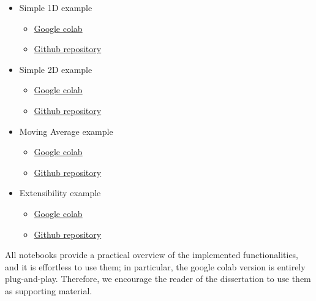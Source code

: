 \begin{itemize}
\item Simple 1D example
  \begin{itemize}
  \item \href{https://colab.research.google.com/drive/13znoPzew3sS89QD-j5usEOefIPNu655Y?usp=sharing}{Google colab}
  \item \href{https://github.com/givasile/edinburgh-thesis/blob/master/notebook_examples/example_1D.ipynb}{Github repository}
  \end{itemize}
 
\item Simple 2D example
  \begin{itemize}
  \item
    \href{https://colab.research.google.com/drive/1T8919FCAi2w9MXm9XKT_iJLnB0y1EN32?usp=sharing}{Google colab}
  \item \href{https://github.com/givasile/edinburgh-thesis/blob/master/notebook_examples/example_2D.ipynb}{Github repository}
  \end{itemize}

\item Moving Average example  
  \begin{itemize}
  \item
    \href{https://colab.research.google.com/drive/145s0-sMSUgi30MeS48SmiJlkd5GYrSQU?usp=sharing}{Google colab}
  \item
    \href{https://github.com/givasile/edinburgh-thesis/blob/master/notebook_examples/example_ma2.ipynb}{Github repository}
  \end{itemize}

\item Extensibility example
  \begin{itemize}
  \item
    \href{https://colab.research.google.com/drive/145s0-sMSUgi30MeS48SmiJlkd5GYrSQU?usp=sharing}{Google colab}
  \item
    \href{https://github.com/givasile/edinburgh-thesis/blob/master/notebook_examples/example_MA2.ipynb}{Github repository}
  \end{itemize}

\end{itemize}

All notebooks provide a practical overview of the implemented
functionalities, and it is effortless to use them; in particular, the
google colab version is entirely plug-and-play. Therefore, we
encourage the reader of the dissertation to use them as supporting
material.
